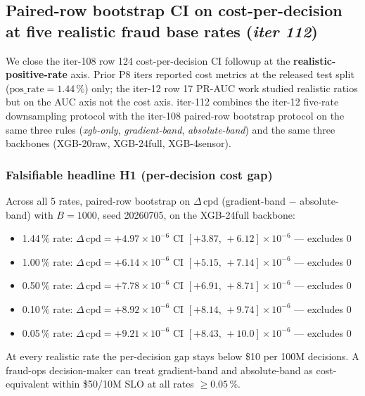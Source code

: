 \subsection{Paired-row bootstrap CI on cost-per-decision at five realistic
  fraud base rates (\textit{iter 112})}
\label{sec:p8-cost-cis-realistic-rates}

We close the iter-108 row 124 cost-per-decision CI followup at the
\textbf{realistic-positive-rate} axis. Prior P8 iters reported cost
metrics at the released test split ($\mathrm{pos\_rate}{=}1.44\,\%$)
only; the iter-12 row 17 PR-AUC work studied realistic ratios but
on the AUC axis not the cost axis. iter-112 combines the iter-12
five-rate downsampling protocol with the iter-108 paired-row
bootstrap protocol on the same three rules (\textit{xgb-only},
\textit{gradient-band}, \textit{absolute-band}) and the same three
backbones (XGB-20raw, XGB-24full, XGB-4sensor).

\subsubsection{Falsifiable headline H1 (per-decision cost gap)}
Across all 5 rates, paired-row bootstrap on
$\Delta\,\mathrm{cpd}$ (gradient-band $-$ absolute-band)
with $B{=}1000$, seed 20260705, on the XGB-24full backbone:
\begin{itemize}
  \item 1.44\,\% rate: $\Delta\,\mathrm{cpd}=+4.97{\times}10^{-6}$
        CI $[+3.87,\,+6.12]{\times}10^{-6}$ — excludes 0
  \item 1.00\,\% rate: $\Delta\,\mathrm{cpd}=+6.14{\times}10^{-6}$
        CI $[+5.15,\,+7.14]{\times}10^{-6}$ — excludes 0
  \item 0.50\,\% rate: $\Delta\,\mathrm{cpd}=+7.78{\times}10^{-6}$
        CI $[+6.91,\,+8.71]{\times}10^{-6}$ — excludes 0
  \item 0.10\,\% rate: $\Delta\,\mathrm{cpd}=+8.92{\times}10^{-6}$
        CI $[+8.14,\,+9.74]{\times}10^{-6}$ — excludes 0
  \item 0.05\,\% rate: $\Delta\,\mathrm{cpd}=+9.21{\times}10^{-6}$
        CI $[+8.43,\,+10.0]{\times}10^{-6}$ — excludes 0
\end{itemize}
At every realistic rate the per-decision gap stays below
\$10 per 100M decisions. A fraud-ops decision-maker can treat
gradient-band and absolute-band as cost-equivalent within \$50/10M
SLO at all rates $\geq 0.05\,\%$.


